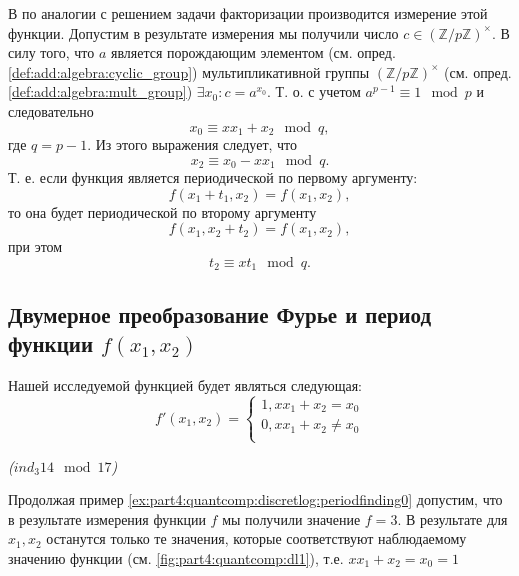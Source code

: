 В по аналогии с решением задачи факторизации производится измерение
этой функции. Допустим в результате измерения мы получили число $c \in
\left(\mathbb{Z}/p\mathbb{Z}\right)^\times$. В силу того, что $a$
является порождающим элементом (см. опред.
\ref{def:add:algebra:cyclic_group}) мультипликативной группы   
$\left(\mathbb{Z}/p\mathbb{Z}\right)^\times$ (см. опред.
\ref{def:add:algebra:mult_group}) $\exists x_0: c = a^{x_0}$. Т. о. с
учетом  $a^{p-1}
\equiv 1 \mod p$ и следовательно
\[
x_0 \equiv x x_1 + x_2 \mod q,
\] 
где $q = p - 1$.
Из этого выражения следует, что
\[
x_2 \equiv x_0 - x x_1 \mod q.
\]
Т. е. если функция является периодической по первому аргументу:
\[
f(x_1 + t_1, x_2) = f(x_1,x_2),
\]
то она будет периодической по второму аргументу
\[
f(x_1, x_2 + t_2) = f(x_1,x_2),
\]
при этом 
\begin{equation}
t_2 \equiv x t_1 \mod q.
\label{eq:part4:quantcomp:discretlogeq}
\end{equation}

\subsection{Двумерное преобразование Фурье и период функции $f(x_1,
  x_2)$}
Нашей исследуемой функцией будет являться следующая:
\[
f'\left(x_1, x_2\right) = 
\begin{cases}
1, x x_1 + x_2 = x_0 \\
0, x x_1 + x_2 \ne x_0 \\
\end{cases}
\]
\begin{example}
\emph{($ind_3{14} \mod{17}$)}
%


Продолжая пример \ref{ex:part4:quantcomp:discretlog:periodfinding0}
допустим, что в результате измерения функции $f$ мы получили значение
$f = 3$. В результате для $x_1, x_2$ останутся только те значения,
которые соответствуют наблюдаемому значению функции (см.
\autoref{fig:part4:quantcomp:dl1}), т.е. $x x_1 + x_2 = x_0 = 1$ 
\label{ex:part4:quantcomp:discretlog:periodfinding1}
\end{example}


